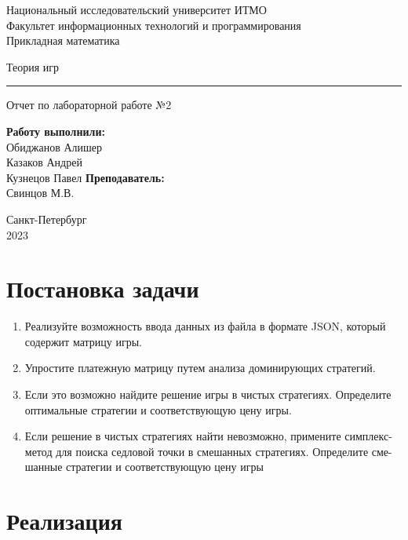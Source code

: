\documentclass{article}
\begin{document}
\begin{center}
    Национальный исследовательский университет ИТМО\\
    Факультет информационных технологий и программирования\\
    Прикладная математика
\end{center}
\vspace{20em}
\begin{center}
    {\Large Теория игр}
    \vspace{3pt}
    \hrule
    \vspace{3pt}
    Отчет по лабораторной работе №2
\end{center}
\vspace{20em}
\begin{flushright}
    \textbf{ Работу выполнили: } \\
    Обиджанов Алишер\\
    Казаков Андрей\\
    Кузнецов Павел
    \vspace{1em}
    \textbf{ Преподаватель: } \\
    Свинцов М.В.
\end{flushright}
\vspace{12em}
\begin{center}
    Санкт-Петербург \\
    2023
\end{center}
\newpage

\section{Постановка задачи}

\begin{enumerate}
    \item Реализуйте возможность ввода данных из файла в формате JSON, который
          содержит матрицу игры.
    \item Упростите платежную матрицу путем анализа доминирующих стратегий.
    \item Если это возможно найдите решение игры в чистых стратегиях. Определите
          оптимальные стратегии и соответствующую цену игры.
    \item Если решение в чистых стратегиях найти невозможно, примените симплекс-
          метод для поиска седловой точки в смешанных стратегиях. Определите сме-
          шанные стратегии и соответствующую цену игры
\end{enumerate}

\section{Реализация}
\end{document}
